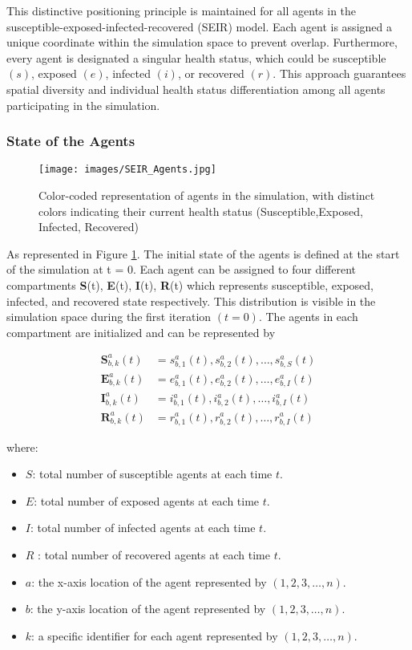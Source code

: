 This distinctive positioning principle is maintained for all agents in the susceptible-exposed-infected-recovered (SEIR) model. Each agent is assigned a unique coordinate within the simulation space to prevent overlap. Furthermore, every agent is designated a singular health status, which could be susceptible $(s)$, exposed $(e)$, infected $(i)$, or recovered $(r)$. This approach guarantees spatial diversity and individual health status differentiation among all agents participating in the simulation.

\subsubsection{State of the Agents}
\label{state}
\begin{figure}[H]
	\centering
	{\texttt{[image: images/SEIR\_Agents.jpg]}
	\caption{Color-coded representation of agents in the simulation, with distinct colors indicating their current
		health status (Susceptible,Exposed, Infected, Recovered)}
	\label{agent1}}
\end{figure}


As represented in Figure \ref{agent1}. The initial state of the agents is defined at the start of the simulation at t = 0. Each agent can be assigned to four different compartments \textbf{S}(t), \textbf{E}(t), \textbf{I}(t), \textbf{R}(t) which represents susceptible, exposed, infected, and recovered state respectively. This distribution is visible in the simulation space during the first iteration $(t = 0)$. The agents in each compartment are initialized and can be represented by 

\begin{align}
	\textbf{S}_{b,k}^a(t) &= s_{b,1}^a(t), s_{b,2}^a(t), \ldots, s_{b,S}^a(t)\\
	\textbf{E}_{b,k}^a(t) &= e_{b,1}^a(t), e_{b,2}^a(t), \ldots, e_{b,I}^a(t)\\
	\textbf{I}_{b,k}^a(t) &= i_{b,1}^a(t), i_{b,2}^a(t), \ldots, i_{b,I}^a(t)\\
	\textbf{R}_{b,k}^a(t) &= r_{b,1}^a(t), r_{b,2}^a(t), \ldots, r_{b,I}^a(t)
\end{align}

where:
\begin{itemize}
	\item \quad $S$: total number of susceptible agents at each time $t$.
	\item \quad $E$: total number of exposed agents at each time $t$.
	\item \quad $I$: total number of infected agents at each time $t$.
	\item \quad $R$ : total number of recovered agents at each time $t$.
	\item \quad $a$: the x-axis location of the agent represented by $(1, 2, 3, \ldots, n)$.
	\item \quad $b$: the y-axis location of the agent represented by $(1, 2, 3, \ldots, n)$.
	\item \quad $k$: a specific identifier for each agent represented by $(1, 2, 3, \ldots, n)$.
\end{itemize}

